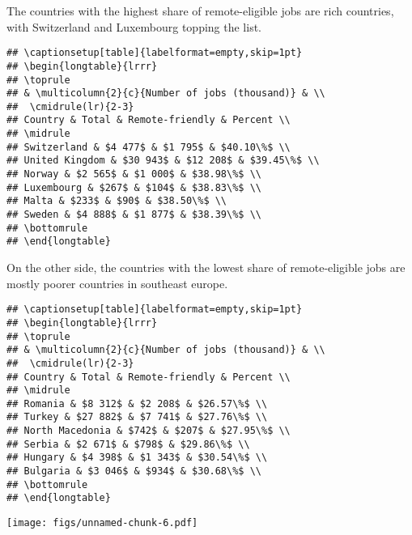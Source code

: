 \documentclass[11pt,]{article}
\begin{document}
The countries with the highest share of remote-eligible jobs are rich
countries, with Switzerland and Luxembourg topping the list.

\begin{verbatim}
## \captionsetup[table]{labelformat=empty,skip=1pt}
## \begin{longtable}{lrrr}
## \toprule
## & \multicolumn{2}{c}{Number of jobs (thousand)} & \\ 
##  \cmidrule(lr){2-3}
## Country & Total & Remote-friendly & Percent \\ 
## \midrule
## Switzerland & $4 477$ & $1 795$ & $40.10\%$ \\ 
## United Kingdom & $30 943$ & $12 208$ & $39.45\%$ \\ 
## Norway & $2 565$ & $1 000$ & $38.98\%$ \\ 
## Luxembourg & $267$ & $104$ & $38.83\%$ \\ 
## Malta & $233$ & $90$ & $38.50\%$ \\ 
## Sweden & $4 888$ & $1 877$ & $38.39\%$ \\ 
## \bottomrule
## \end{longtable}
\end{verbatim}

On the other side, the countries with the lowest share of
remote-eligible jobs are mostly poorer countries in southeast europe.

\begin{verbatim}
## \captionsetup[table]{labelformat=empty,skip=1pt}
## \begin{longtable}{lrrr}
## \toprule
## & \multicolumn{2}{c}{Number of jobs (thousand)} & \\ 
##  \cmidrule(lr){2-3}
## Country & Total & Remote-friendly & Percent \\ 
## \midrule
## Romania & $8 312$ & $2 208$ & $26.57\%$ \\ 
## Turkey & $27 882$ & $7 741$ & $27.76\%$ \\ 
## North Macedonia & $742$ & $207$ & $27.95\%$ \\ 
## Serbia & $2 671$ & $798$ & $29.86\%$ \\ 
## Hungary & $4 398$ & $1 343$ & $30.54\%$ \\ 
## Bulgaria & $3 046$ & $934$ & $30.68\%$ \\ 
## \bottomrule
## \end{longtable}
\end{verbatim}

\texttt{[image: figs/unnamed-chunk-6.pdf]}
\end{document}
